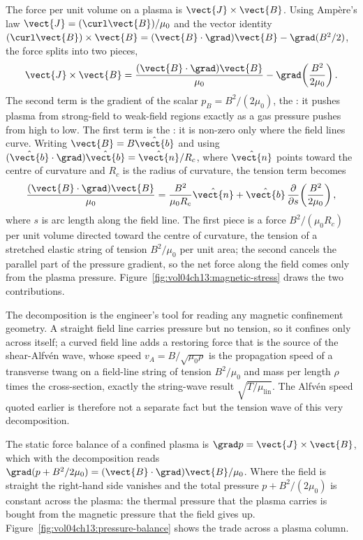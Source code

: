 The force per unit volume on a plasma is $\vect{J}\times\vect{B}$. Using
Amp\`ere's law $\vect{J} = (\curl\vect{B})/\mu_{0}$ and the vector identity
$(\curl\vect{B})\times\vect{B} = (\vect{B}\cdot\grad)\vect{B} - \grad(B^{2}
/2)$, the force splits into two pieces,
\[
\vect{J}\times\vect{B}
= \frac{(\vect{B}\cdot\grad)\vect{B}}{\mu_{0}}
- \grad\!\left(\frac{B^{2}}{2\mu_{0}}\right).
\]
The second term is the gradient of the scalar $p_{B} = B^{2}/(2\mu_{0})$, the
: it pushes plasma from strong-field to weak-field
regions exactly as a gas pressure pushes from high to low. The first term is
the : it is non-zero only where the field lines
curve. Writing $\vect{B} = B\hat{\vect{b}}$ and using $(\hat{\vect{b}}\cdot
\grad)\hat{\vect{b}} = \hat{\vect{n}}/R_{c}$, where $\hat{\vect{n}}$ points
toward the centre of curvature and $R_{c}$ is the radius of curvature, the
tension term becomes
\[
\frac{(\vect{B}\cdot\grad)\vect{B}}{\mu_{0}}
= \frac{B^{2}}{\mu_{0}R_{c}}\hat{\vect{n}}
+ \hat{\vect{b}}\,\frac{\partial}{\partial s}\!
\left(\frac{B^{2}}{2\mu_{0}}\right),
\]
where $s$ is arc length along the field line. The first piece is a force
$B^{2}/(\mu_{0}R_{c})$ per unit volume directed toward the centre of
curvature, the tension of a stretched elastic string of tension
$B^{2}/\mu_{0}$ per unit area; the second cancels the parallel part of the
pressure gradient, so the net force along the field comes only from the
plasma pressure. Figure~\ref{fig:vol04ch13:magnetic-stress} draws the two
contributions.



The decomposition is the engineer's tool for reading any magnetic
confinement geometry. A straight field line carries pressure but no tension,
so it confines only across itself; a curved field line adds a restoring
force that is the source of the shear-Alfv\'en wave, whose speed
$v_{A} = B/\sqrt{\mu_{0}\rho}$ is the propagation speed of a transverse
twang on a field-line string of tension $B^{2}/\mu_{0}$ and mass per length
$\rho$ times the cross-section, exactly the string-wave result $\sqrt{T/
\mu_{\mathrm{lin}}}$. The Alfv\'en speed quoted earlier is therefore not a
separate fact but the tension wave of this very decomposition.

The static force balance of a confined plasma is $\grad p = \vect{J}\times
\vect{B}$, which with the decomposition reads $\grad(p + B^{2}/2\mu_{0}) =
(\vect{B}\cdot\grad)\vect{B}/\mu_{0}$. Where the field is straight the
right-hand side vanishes and the total pressure $p + B^{2}/(2\mu_{0})$ is
constant across the plasma: the thermal pressure that the plasma carries is
bought from the magnetic pressure that the field gives up.
Figure~\ref{fig:vol04ch13:pressure-balance} shows the trade across a plasma
column.

